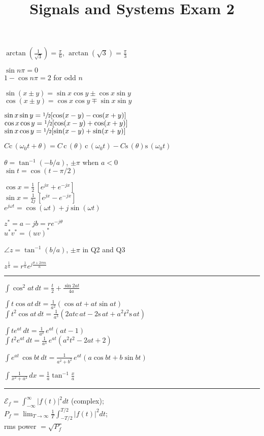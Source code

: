 \documentclass[4pt]{article}
\title{Signals and Systems Exam 2}
\theoremstyle{definition}
\theoremstyle{definition}
\renewcommand{\c}{\mathrm{c}\,}
\newcommand{\s}{\mathrm{s}\,}
\renewcommand{\o}{\omega}
\newcommand{\ra}{\rightarrow}
\begin{document}
\raggedright
    $\arctan(\frac{1}{\sqrt{3}}) = \frac{\pi}{6}$,  $\arctan(\sqrt{3}) = \frac{\pi} 3$

    $\sin n\pi = 0$\\
    $1-\cos n\pi = 2$ for odd $n$

    $\sin(x\pm y) = \sin x \cos y \pm \cos x \sin y$\\
    $\cos(x\pm y) = \cos x \cos y \mp \sin x \sin y$

    $\sin x \sin y = \sfrac{1}{2}[\cos(x-y) - \cos(x+y)]$\\ %
    $\cos x \cos y = \sfrac{1}{2}[\cos(x-y) + \cos(x+y)]$\\
    $\sin x \cos y = \sfrac{1}{2}[\sin(x-y) + \sin(x+y)]$

    $C \c(\o_0 t + \theta) = C\,\c(\theta) \,\c(\omega_0 t) - C\s(\theta)\s(\o_0 t)$

    $\theta = \tan^{-1} (-b/a)$, $\pm \pi$ when $a<0$\\
    $\sin t = \cos (t-\pi/2)$

    $\cos x = \frac{1}{2}\,[e^{jx} + e^{-jx}]$\\
    $\sin x = \frac{1}{2j}\, [e^{jx} - e^{-jx}]$\\
    $e^{j\omega t} = \cos(\omega t) + j\sin (\omega t)$

    $z^* = a-jb = re^{-j\theta}$\\
    $u^* v^* = (uv)^*$

    $\angle z = \tan^{-1}(b/a)$, $\pm \pi$ in Q2 and Q3

    $z^{\frac 1 n} = r^{\frac 1 n} e^{j \frac{\theta + 2\pi m}{n}}$
\rule{\linewidth}{0.5pt}
    $\int \cos^2 at \, dt = \frac{t}{2} + \frac{\sin2at}{4a}$

    $\int t \cos at \, dt = \frac{1}{a^2}(\cos at + at\sin at)$\\
    $\int t^2 \cos at\, dt = \frac{1}{a^3}(2at\c at - 2\s at + a^2t^2\s at)$

    $\int te^{at}\, dt = \frac{1}{a^2} \, e^{at} (at-1)$\\
    $\int t^2 e^{at} \, dt = \frac{1}{a^3} \, e^{at} (a^2t^2 - 2at + 2)$

    $\int e^{at} \,\cos bt \, dt = \frac{1}{a^2+b^2} \,e^{at}(a\cos 
    bt + b \sin bt)$

    \(\int \frac{1} {x^2+a^2}\, dx = \frac{1}{a} \tan^{-1} \frac x a\)
    \rule{\linewidth}{0.5pt}
    $\mathcal{E}_f = \int_{-\infty}^{\infty} |f(t)|^2 dt$ (complex); \\
    $P_f = \lim_{T\ra\infty}\frac{1}{T} \int^{T/2}_{-T/2} |f(t)|^2 dt $; \\
    rms power $= \sqrt {P_f}$
\end{document}
